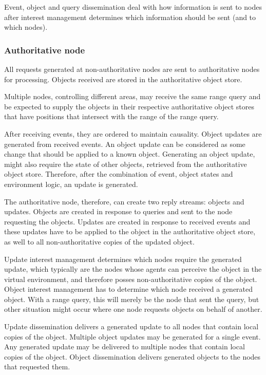 Event, object and query dissemination deal with how information is sent to nodes after interest management determines which information should be sent (and to which nodes).

\subsubsection{Authoritative node}

All requests generated at non-authoritative nodes are sent to authoritative nodes for processing. Objects received are stored in the authoritative object store.

Multiple nodes, controlling different areas, may receive the same range query and be expected to supply the objects in their respective authoritative object stores that have positions that intersect with the range of the range query.

After receiving events, they are ordered to maintain causality. Object updates are generated from received events. An object update can be considered as some change that should be applied to a known object. Generating an object update, might also require the state of other objects, retrieved from the authoritative object store. Therefore, after the combination of event, object states and environment logic, an update is generated.

The authoritative node, therefore, can create two reply streams: objects and updates. Objects are created in response to queries and sent to the node requesting the objects. Updates are created in response to received events and these updates have to be applied to the object in the authoritative object store, as well to all non-authoritative copies of the updated object.

Update interest management determines which nodes require the generated update, which typically are the nodes whose agents can perceive the object in the virtual environment, and therefore posses non-authoritative copies of the object. Object interest management has to determine which node received a generated object. With a range query, this will merely be the node that sent the query, but other situation might occur where one node requests objects on behalf of another.

Update dissemination delivers a generated update to all nodes that contain local copies of the object. Multiple object updates may be generated for a single event. Any generated update may be delivered to multiple nodes that contain local copies of the object. Object dissemination delivers generated objects to the nodes that requested them.

